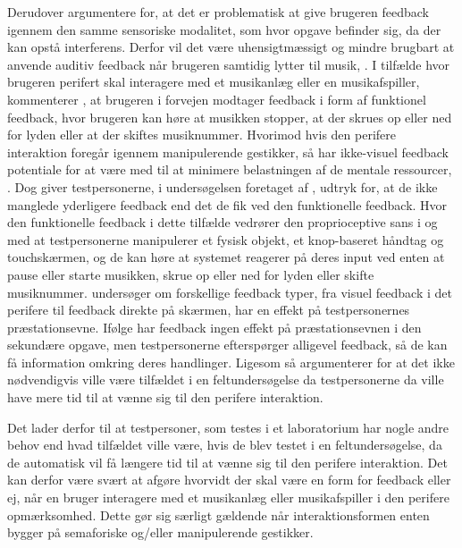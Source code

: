 Derudover argumentere \textcite[s. 3]{PDF:FacilitatingPIDesignAndEvaluation} for, at det er problematisk at give brugeren feedback igennem den samme sensoriske modalitet, som hvor opgave befinder sig, da der kan opstå interferens. Derfor vil det være uhensigtmæssigt og mindre brugbart at anvende auditiv feedback når brugeren samtidig lytter til musik, \parencite[s. 3]{PDF:FacilitatingPIDesignAndEvaluation}. I tilfælde hvor brugeren perifert skal interagere med et musikanlæg eller en musikafspiller, kommenterer \textcite[s. 19]{PDF:PIEmbeddingHCIOnTheRelevance}, at brugeren i forvejen modtager feedback i form af funktionel feedback, hvor brugeren kan høre at musikken stopper, at der skrues op eller ned for lyden eller at der skiftes musiknummer. Hvorimod hvis den perifere interaktion foregår igennem manipulerende gestikker, så har ikke-visuel feedback potentiale for at være med til at minimere belastningen af de mentale ressourcer, \parencite[s. 3]{PDF:FacilitatingPIDesignAndEvaluation}. Dog giver testpersonerne, i undersøgelsen foretaget af \textcite[s. 173]{PDF:ComparingInputModalities}, udtryk for, at de ikke manglede yderligere feedback end det de fik ved den funktionelle feedback. Hvor den funktionelle feedback i dette tilfælde vedrører den proprioceptive sans i og med at testpersonerne manipulerer et fysisk objekt, et knop-baseret håndtag og touchskærmen, og de kan høre at systemet reagerer på deres input ved enten at pause eller starte musikken, skrue op eller ned for lyden eller skifte musiknummer. \blankline
%
\textcite[ss. 1263-1268]{PDF:ComparingModFeedback} undersøger om forskellige feedback typer, fra visuel feedback i det perifere til feedback direkte på skærmen, har en effekt på testpersonernes præstationsevne. Ifølge \textcite[ss. 1267-1268]{PDF:ComparingModFeedback} har feedback ingen effekt på præstationsevnen i den sekundære opgave, men testpersonerne efterspørger alligevel feedback, så de kan få information omkring deres handlinger. Ligesom \textcite[s. 174]{PDF:ComparingInputModalities} så argumenterer \textcite[s. 1268]{PDF:ComparingModFeedback} for at det ikke nødvendigvis ville være tilfældet i en feltundersøgelse da testpersonerne da ville have mere tid til at vænne sig til den perifere interaktion. 

Det lader derfor til at testpersoner, som testes i et laboratorium har nogle andre behov end hvad tilfældet ville være, hvis de blev testet i en feltundersøgelse, da de automatisk vil få længere tid til at vænne sig til den perifere interaktion. Det kan derfor være svært at afgøre hvorvidt der skal være en form for feedback eller ej, når en bruger interagere med et musikanlæg eller musikafspiller i den perifere opmærksomhed. Dette gør sig særligt gældende når interaktionsformen enten bygger på semaforiske og/eller manipulerende gestikker.  
%
